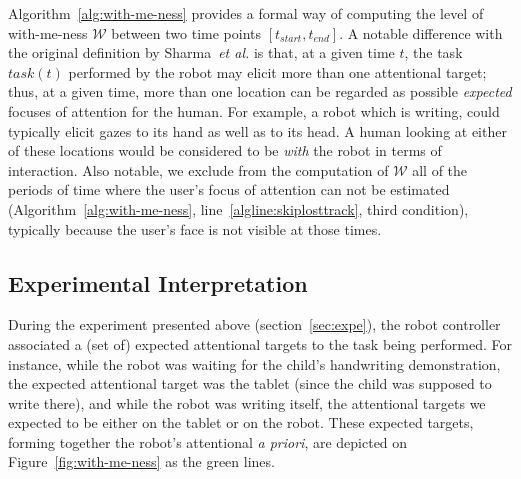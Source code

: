\documentclass{sig-alternate}
\newcommand{\etal}{\textit{et al.}\xspace}
\begin{document}
Algorithm~\ref{alg:with-me-ness} provides a formal way of computing the level of
with-me-ness $\mathcal{W}$ between two time points $[t_{start}, t_{end}]$. A
notable difference with the original definition by Sharma~\etal is that, at a
given time $t$, the task $task(t)$ performed by the robot may elicit more than
one attentional target; thus, at a given time, more than one location can be
regarded as possible \emph{expected} focuses of attention for the human. For
example, a robot which is writing, could typically elicit gazes to its hand as
well as to its head. A human looking at either of these locations would be
considered to be \emph{with} the robot in terms of interaction. Also notable, we
exclude from the computation of $\mathcal{W}$ all of the periods of time where
the user's focus of attention can not be estimated (Algorithm~\ref{alg:with-me-ness},
line~\ref{algline:skiplosttrack}, third condition), typically because the user's
face is not visible at those times.


\subsection{Experimental Interpretation}

During the experiment presented above (section~\ref{sec:expe}), the robot
controller associated a (set of) expected attentional targets to the task being
performed. For instance, while the robot was waiting for the child's handwriting
demonstration, the expected attentional target was the tablet (since the child
was supposed to write there), and while the robot was writing itself, the
attentional targets we expected to be either on the tablet or on the robot.
These expected targets, forming together the robot's attentional {\it a priori},
are depicted on Figure~\ref{fig:with-me-ness} as the green lines.
\end{document}
